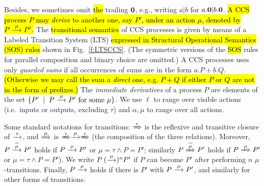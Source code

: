 Besides, we sometimes omit \hl{the} trailing ${\boldsymbol 0}$, e.g., writing $a|b$ for $a.{\boldsymbol 0} |b .{\boldsymbol 0}$.
\hl{A CCS process $P$ may \emph{derive} to another one, say $P'$, under
  an action $\mu$, denoted by $P \arr{\mu} P'$.}
The \hl{transitional semantics} of CCS processes is given by means of
a Labeled Transition System (LTS) \hl{expressed in Structural Operational
Semantics (SOS) rules} shown in Fig.~\ref{f:LTSCCS}.
(The symmetric versions of the \hl{SOS} rules for
parallel composition and binary choice are omitted.)
A CCS processes uses only \emph{guarded sums} if all occurrences of
sums are in the form $a.P + b.Q$. \hl{(Otherwise we may call the sum
a \emph{direct} one, e.g. $P + Q$ if either $P$ or $Q$ are not in the
form of prefixes.)}
 The \emph{immediate derivatives} of a
process $P$ are elements of the set $\{P' \st P \arr\mu P' \mbox{
  for some $\mu$}\}$.
We use $\ell$ to range over
visible actions (i.e.~inputs or outputs, excluding  $\tau$)
and $\alpha, \mu$  to range over all actions.

Some standard notations for transitions: $\Arr\epsilon$ is the 
reflexive and transitive closure of $\arr\tau$, and 
$\Arr \mu $ is $\Arr\epsilon \arr\mu \Arr\epsilon$ (the
composition of the three relations).
Moreover,   
$P \arcap \mu P'$ holds if $P \arr\mu P'$ or $\mu =\tau \wedge P = P'$; similarly 
$P \Arcap \mu P'$ holds if $P \Arr\mu P'$ or $\mu =\tau \wedge P = P'$).
We write $P \:(\arr\mu)^n P'$ if $P$ can become $P'$ after performing
$n$ $\mu$-transitions. Finally, $P \arr\mu$ holds if there is $P'$
with $P \arr\mu P'$, and similarly for other forms of transitions.


